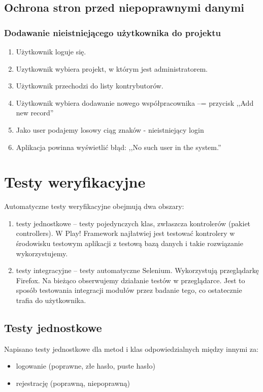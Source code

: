 \documentclass[a4paper,12pt,notitlepage]{mwrep}
\begin{document}
\subsection{Ochrona stron przed niepoprawnymi danymi}
\subsubsection{Dodawanie nieistniejącego użytkownika do projektu}
\begin{enumerate}
	\item	Użytkownik loguje się.
	\item	Uzytkownik wybiera projekt, w którym jest administratorem.
	\item	Użytkownik przechodzi do listy kontrybutorów.
	\item	Użytkownik wybiera dodawanie nowego współpracownika --= przycisk ,,Add new record''
	\item	Jako user podajemy losowy ciąg znaków - nieistniejący login
	\item	Aplikacja powinna wyświetlić błąd: ,,No such user in the system.''
\end{enumerate}


\section{Testy weryfikacyjne}
Automatyczne testy weryfikacyjne obejmują dwa obszary:
\begin{enumerate}
	\item	testy jednostkowe -- testy pojedynczych klas, zwłaszcza kontrolerów (pakiet controllers). W Play! Framework najłatwiej 
		jest testować kontrolery w środowisku testowym aplikacji z testową bazą danych i takie rozwiązanie wykorzystujemy.
	\item	testy integracyjne -- testy automatyczne Selenium. Wykorzystują przeglądarkę Firefox. Na bieżąco obserwujemy działanie 
		testów w przeglądarce. Jest to sposób testowania integracji modułów przez badanie tego, co ostatecznie trafia do użytkownika.
\end{enumerate}


\subsection{Testy jednostkowe}
Napisano testy jednostkowe dla metod i klas odpowiedzialnych między innymi za:
\begin{itemize}
	\item	logowanie (poprawne, złe hasło, puste hasło)
	\item	rejestrację (poprawną, niepoprawną)
\end{itemize}
\end{document}
